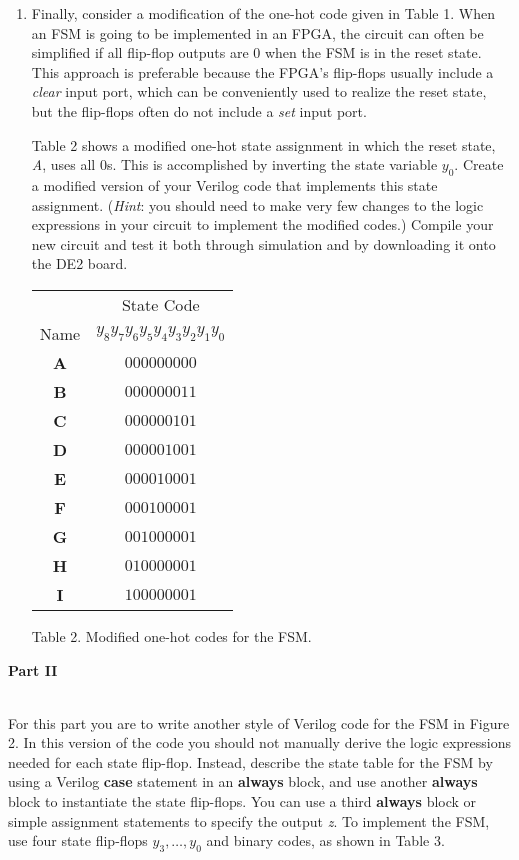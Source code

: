 \documentclass[epsfig,10pt,fullpage]{article}
\begin{document}
\begin{enumerate}
\item Finally, consider
a modification of the one-hot code given in Table 1. When an FSM is going to be
implemented in an FPGA, the circuit can often be simplified if all flip-flop
outputs are 0 when the FSM is in the reset state. This approach is preferable because the
FPGA's flip-flops usually include a {\it clear} input port, which can be conveniently
used to realize the reset state, but the flip-flops often do not include a {\it set} input port.

\newpage
Table 2 shows a modified one-hot state assignment in which the reset state, {\it A},
uses all 0s. This is accomplished by inverting the state variable $y_0$. 
Create a modified version of your Verilog code that implements this state
assignment. ({\it Hint}: you should need to make very few changes to the logic expressions
in your circuit to implement the modified codes.) Compile your new circuit and test it both
through simulation and by downloading it onto the DE2 board.

\begin{center}
\begin{tabular}{c|c}
~ & State Code \\ 
Name & $y_8 y_7 y_6 y_5 y_4 y_3 y_2 y_1 y_0$ \\ \hline
\rule[-0.075in]{0in}{0.25in}{\bf A} & $000000000$ \\ 
{\bf B} & $000000011$ \\ 
{\bf C} & $000000101$ \\ 
{\bf D} & $000001001$ \\ 
{\bf E} & $000010001$ \\ 
{\bf F} & $000100001$ \\ 
{\bf G} & $001000001$ \\ 
{\bf H} & $010000001$ \\ 
{\bf I} & $100000001$ \\ 
\end{tabular}
\end{center}

\begin{center}
Table 2. Modified one-hot codes for the FSM.
\end{center}

\end{enumerate}

\noindent
{\bf Part II}

~\\
\noindent
For this part you are to write another style of Verilog code for the FSM in Figure 2. In
this version of the code you should not manually derive the logic expressions needed for
each state flip-flop. Instead, describe the state table for the FSM by using a
Verilog {\bf case} statement in an {\bf always} block, and use another {\bf always} block to
instantiate the state flip-flops. You can use a third {\bf always} block or simple assignment
statements to specify the output {\it z}. To implement the FSM, use four state flip-flops
$y_3, \ldots, y_0$ and binary codes, as shown in Table 3.
\end{document}
